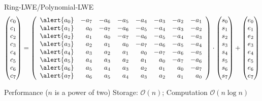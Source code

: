 \documentclass[xcolor=table,10pt,aspectratio=169]{beamer}
\begin{document}
\begin{frame}[label={sec:orgbd68151}]{Ring-LWE/Polynomial-LWE}
\[
\begin{pmatrix}c_{0} \\ c_{1} \\ c_{2} \\ c_{3} \\ c_{4} \\ c_{5} \\ c_{6} \\ c_{7}\end{pmatrix} = 
\left(\begin{array}{rrrrrrrr}
\alert{a_{0}} & -a_{7} & -a_{6} & -a_{5} & -a_{4} & -a_{3} & -a_{2} & -a_{1} \\
\alert{a_{1}} & a_{0} & -a_{7} & -a_{6} & -a_{5} & -a_{4} & -a_{3} & -a_{2} \\
\alert{a_{2}} & a_{1} & a_{0} & -a_{7} & -a_{6} & -a_{5} & -a_{4} & -a_{3} \\
\alert{a_{3}} & a_{2} & a_{1} & a_{0} & -a_{7} & -a_{6} & -a_{5} & -a_{4} \\
\alert{a_{4}} & a_{3} & a_{2} & a_{1} & a_{0} & -a_{7} & -a_{6} & -a_{5} \\
\alert{a_{5}} & a_{4} & a_{3} & a_{2} & a_{1} & a_{0} & -a_{7} & -a_{6} \\
\alert{a_{6}} & a_{5} & a_{4} & a_{3} & a_{2} & a_{1} & a_{0} & -a_{7} \\
\alert{a_{7}} & a_{6} & a_{5} & a_{4} & a_{3} & a_{2} & a_{1} & a_{0}
\end{array}\right)\cdot
\begin{pmatrix}s_{0} \\ s_{1} \\ s_{2} \\ s_{3} \\ s_{4} \\ s_{5} \\ s_{6} \\ s_{7}\end{pmatrix} +
\begin{pmatrix}e_{0} \\ e_{1} \\ e_{2} \\ e_{3} \\ e_{4} \\ e_{5} \\ e_{6} \\ e_{7}\end{pmatrix}
\]
\begin{block}{Performance (\(n\) is a power of two)}
Storage: \(\mathcal{O}(n)\); Computation \(\mathcal{O}(n \log n)\)
\end{block}
\end{frame}
\end{document}
